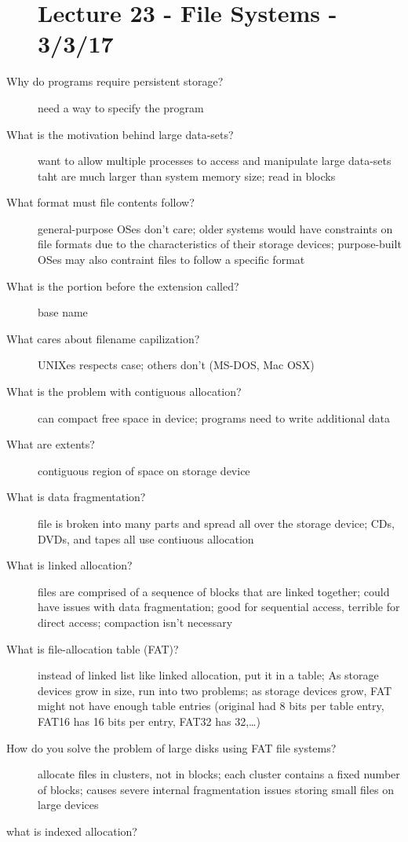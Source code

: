\documentclass[10pt]{article}
\begin{document}
\begin{description}
\section{Lecture 23 - File Systems - 3/3/17}
\item[Why do programs require persistent storage?]
  need a way to specify the program
\item[What is the motivation behind large data-sets?]
  want to allow multiple processes to access and manipulate large data-sets taht are much larger than system memory size;
  read in blocks
\item[What format must file contents follow?]
  general-purpose OSes don't care;
  older systems would have constraints on file formats due to the characteristics of their storage devices;
  purpose-built OSes may also contraint files to follow a specific format
\item[What is the portion before the extension called?]
  base name
\item[What cares about filename capilization?]
  UNIXes respects case; others don't (MS-DOS, Mac OSX)
\item[What is the problem with contiguous allocation?]
  can compact free space in device; programs need to write additional data
\item[What are extents?]
  contiguous region of space on storage device
\item[What is data fragmentation?]
  file is broken into many parts and spread all over the storage device;
  CDs, DVDs, and tapes all use contiuous allocation
\item[What is linked allocation?]
  files are comprised of a sequence of blocks that are linked together;
  could have issues with data fragmentation;
  good for sequential access, terrible for direct access;
  compaction isn't necessary
\item[What is file-allocation table (FAT)?]
  instead of linked list like linked allocation, put it in a table;
  As storage devices grow in size, run into two problems;
  as storage devices grow, FAT might not have enough table entries (original had 8 bits per table entry, FAT16 has 16 bits per entry, FAT32 has 32,\dots)
\item[How do you solve the problem of large disks using FAT file systems?]
  allocate files in clusters, not in blocks;
  each cluster contains a fixed number of blocks;
  causes severe internal fragmentation issues storing small files on large devices
\item[what is indexed allocation?]

\end{description}
\end{document}
